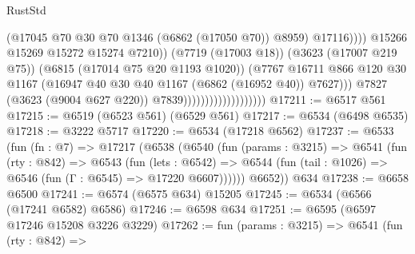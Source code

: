 \begin{lexlean}{RustStd}
\begin{coremodule}
                                                        (@17045
                                                          @70
                                                          @30
                                                          @70
                                                          @1346
                                                          (@6862 (@17050 @70))
                                                          @8959)
                                                        @17116))))
                                                @15266
                                                @15269
                                                @15272
                                                @15274
                                                @7210))
                                            (@7719 (@17003 @18))
                                            (@3623 (@17007 @219 @75))
                                            (@6815 (@17014 @75 @20 @1193 @1020))
                                            (@7767
                                              @16711
                                              @866
                                              @120
                                              @30
                                              @1167
                                              (@16947
                                                @40
                                                @30
                                                @40
                                                @1167
                                                (@6862 (@16952 @40))
                                                @7627)))
                                          @7827
                                          (@3623 (@9004 @627 @220))
                                          @7839)))))))))))))))))))
@17211 := @6517 @561
@17215 := @6519 (@6523 @561) (@6529 @561)
@17217 := @6534 (@6498 @6535)
@17218 := @3222 @5717
@17220 := @6534 (@17218 @6562)
@17237 := @6533
    (fun (fn : @7) =>
    @17217
      (@6538
        (@6540
          (fun (params : @3215) =>
          @6541
            (fun (rty : @842) =>
            @6543
              (fun (lets : @6542) =>
              @6544 (fun (tail : @1026) => @6546 (fun (Γ : @6545) => @17220 @6607))))))
        @6652))
    @634
@17238 := @6658 @6500
@17241 := @6574 (@6575 @634) @15205
@17245 := @6534 (@6566 (@17241 @6582) @6586)
@17246 := @6598 @634
@17251 := @6595 (@6597 @17246 @15208 @3226 @3229)
@17262 := fun (params : @3215) =>
  @6541
    (fun (rty : @842) =>

\end{coremodule}
\end{lexlean}
